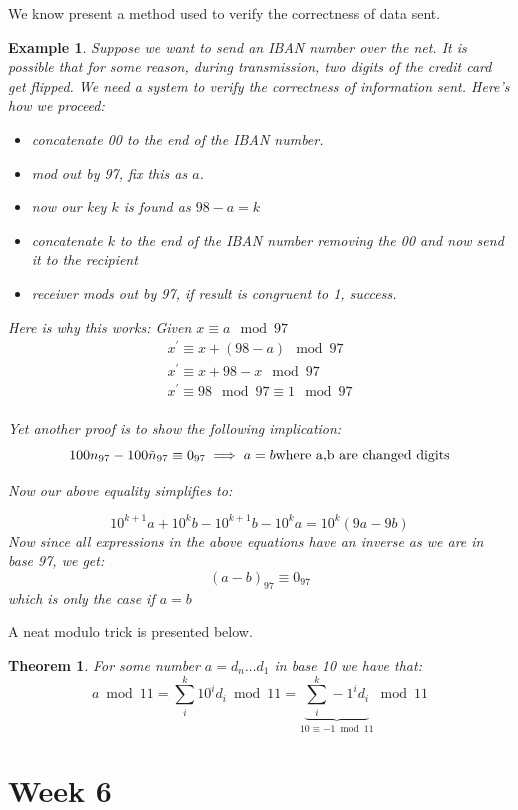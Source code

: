 \documentclass[titlepage]{article}
\newtheorem{theorem}{Theorem}[section]
\newtheorem{example}{Example}[section]
\begin{document}
We know present a method used to verify the correctness of data sent.
\begin{example}
Suppose we want to send an IBAN number over the net. It is possible that for some reason, during transmission, two digits of the credit card get flipped. We need a system to verify the correctness of information sent. Here's how we proceed:
\begin{itemize}
    \item concatenate 00 to the end of the IBAN number.
    \item mod out by 97, fix this as $a$.
    \item now our key $k$ is found as $98-a=k$
    \item concatenate $k$ to the end of the IBAN number removing the 00 and now send it to the recipient
    \item receiver mods out by 97, if result is congruent to 1, success.
\end{itemize}

Here is why this works:
Given $x \equiv a \mod{97}$
\begin{align*}
    x^{\prime} \equiv x + (98 - a) \mod{97}\\
    x^{\prime} \equiv x + 98 - x \mod{97}\\
    x^{\prime} \equiv 98 \mod{97} \equiv 1 \mod{97}\\
\end{align*}

Yet another proof is to show the following implication:
$$100n_{97} - 100\Tilde{n}_{97} \equiv 0_{97} \implies a=b \text{where a,b are changed digits}$$

Now our above equality simplifies to:

$$10^{k+1}a+10^{k}b - 10^{k+1}b - 10^{k}a = 10^{k}(9a-9b)$$
Now since all expressions in the above equations have an inverse as we are in base 97, we get:
$$ (a-b)_{97} \equiv 0_{97}$$
which is only the case if $a=b$
\end{example}

A neat modulo trick is presented below.

\begin{theorem}
For some number $a = d_{n}\ldots d_{1}$ in base 10 we have that:
$$a \bmod{11} = \sum_{i}^{k}10^{i}d_{i} \bmod{11} = \underbrace{\sum_{i}^{k}-1^{i}d_{i}}_{10\equiv-1\bmod{11}} \bmod{11}$$
\end{theorem}

\section{Week 6}
\end{document}
